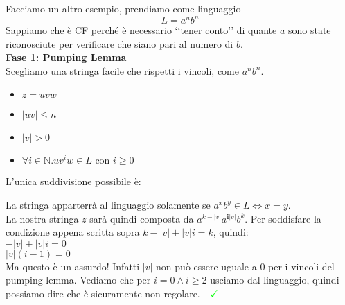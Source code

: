 \documentclass[a4paper,oneside]{scrbook}
\newcommand{\greenmark}{\quad \textcolor{green}{\checkmark}}
\begin{document}
Facciamo un altro esempio, prendiamo come linguaggio
$$L={a^nb^n}$$
Sappiamo che è CF perché è necessario ‘‘tener conto’’ di quante $a$ sono state riconosciute per verificare che siano pari al numero di $b$.\\
\textbf{Fase 1: Pumping Lemma}\\
Scegliamo una stringa facile che rispetti i vincoli, come $a^nb^n$.
\begin{itemize}
	\item $z=uvw$
	\item $|uv|\leq n$
	\item $|v|>0$
	\item $\forall i \in \mathbb{N}.uv^iw\in L \text{ con }i\geq0$
\end{itemize}
L'unica suddivisione possibile è:
\begin{center}
\end{center}
La stringa apparterrà al linguaggio solamente se $a^xb^y\in L \Leftrightarrow x=y$.\\
La nostra stringa $z$ sarà quindi composta da $a^{k-|v|}a^{\textbf{i}|v|}b^k$. Per soddisfare la condizione appena scritta sopra $k-|v|+|v|i=k$, quindi:\\
$-|v|+|v|i=0$\\
$|v|(i-1)=0$\\
Ma questo è un assurdo! Infatti $|v|$ non può essere uguale a $0$ per i vincoli del pumping lemma.
Vediamo che per $i=0 \wedge i\geq2$ usciamo dal linguaggio, quindi possiamo dire che è sicuramente non regolare.$\greenmark$\\
\end{document}

